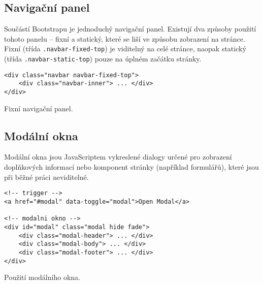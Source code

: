 \subsection{Navigační panel}

Součástí Bootstrapu je jednoduchý navigační panel. Existují dva způsoby použití tohoto panelu -- fixní a statický, které se liší ve způsobu zobrazení na stránce. Fixní (třída \texttt{.navbar-fixed-top}) je viditelný na celé stránce, naopak statický (třída \texttt{.navbar-static-top}) pouze na úplném začátku stránky. \cite{19}

\begin{example}
    \centering
    \begin{lstlisting}
<div class="navbar navbar-fixed-top">
    <div class="navbar-inner"> ... </div>
</div>
    \end{lstlisting}
    \caption{Fixní navigační panel.}
    \label{example:navbar}
\end{example}

\subsection{Modální okna}

Modální okna jsou JavaScriptem vykreslené dialogy určené pro zobrazení doplňkových informací nebo komponent stránky (například formulářů), které jsou při běžné práci neviditelné. \cite{19}

\begin{example}
    \centering
    \begin{lstlisting}[language=html5]
<!-- trigger -->
<a href="#modal" data-toggle="modal">Open Modal</a>

<!-- modalni okno -->
<div id="modal" class="modal hide fade">
    <div class="modal-header"> ... </div>
    <div class="modal-body"> ... </div>
    <div class="modal-footer"> ... </div>
</div>
    \end{lstlisting}
    \caption{Použití modálního okna.}
    \label{example:modal}
\end{example}
